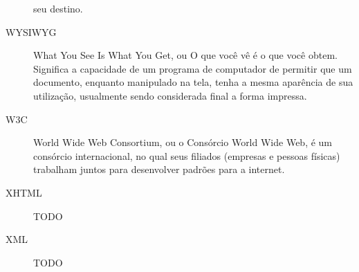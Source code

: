 \begin{description}
seu destino.
\item[WYSIWYG ] What You See Is What You Get, ou O que você vê é o que
você obtem. Significa a capacidade de um programa de computador de
permitir que um documento, enquanto manipulado na tela, tenha a mesma
aparência de sua utilização, usualmente sendo considerada final a
forma impressa.
\item[W3C ] World Wide Web Consortium, ou o Consórcio World Wide Web,
é um consórcio internacional, no qual seus filiados (empresas e
pessoas físicas) trabalham juntos para desenvolver padrões para a
internet.
\item[XHTML ] TODO
\item[XML ] TODO

\end{description}
\newpage
